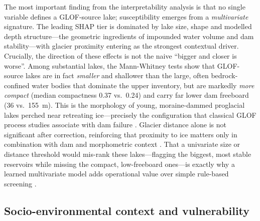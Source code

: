 \documentclass[pdflatex,sn-basic]{sn-jnl}%
\begin{document}
The most important finding from the interpretability analysis is that no
single variable defines a GLOF-source lake; susceptibility emerges from a
\emph{multivariate} signature. The leading SHAP tier is dominated by lake
size, shape and modelled depth structure---the geometric ingredients of
impounded water volume and dam stability---with glacier proximity entering
as the strongest contextual driver. Crucially, the direction of these
effects is not the naive ``bigger and closer is worse''. Among substantial
lakes, the Mann-Whitney tests show that GLOF-source lakes are in fact
\emph{smaller} and shallower than the large, often bedrock-confined water
bodies that dominate the upper inventory, but are markedly \emph{more
compact} (median compactness 0.37 vs.\ 0.24) and carry far lower dam
freeboard (36 vs.\ 155~m). This is the morphology of young, moraine-dammed
proglacial lakes perched near retreating ice---precisely the configuration
that classical GLOF process studies associate with dam failure
\citep{Clague2000,Westoby2014,Emmer2017,Emmer2013}. Glacier distance alone
is not significant after correction, reinforcing that proximity to ice
matters only in combination with dam and morphometric context
\citep{Allen2022,Emmer2022}. That a univariate size or distance threshold
would mis-rank these lakes---flagging the biggest, most stable reservoirs
while missing the compact, low-freeboard ones---is exactly why a learned
multivariate model adds operational value over simple rule-based
screening \citep{Frey2010,Sattar2022,Munoz2020}.

\subsection{Socio-environmental context and vulnerability}\label{sec:socio}
\end{document}
